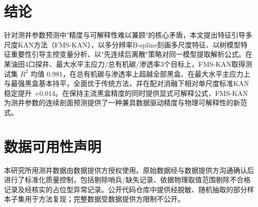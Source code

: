 \documentclass[final,3p,times,twocolumn]{elsarticle}
\begin{document}
\section{结论}

针对测井参数预测中"精度与可解释性难以兼顾"的核心矛盾，本文提出特征引导多尺度KAN方法（FMS-KAN），以多分辨率B-spline刻画多尺度特征、以树模型特征重要性引导主控变量分析、以"先连续后离散"策略对同一模型提取解析公式。在某油田4口探井、最大水平主应力/总有机碳/渗透率3个目标上，FMS-KAN取得测试集 $R^2$ 均值 0.981，在总有机碳与渗透率上超越全部黑盒、在最大水平主应力上与最强黑盒基本持平，全面优于传统方法，并在配对消融下相对单尺度标准KAN稳定提升 +0.014。在保持主流黑盒精度的同时提供显式可解释公式，FMS-KAN为测井参数的连续剖面预测提供了一种兼具数据驱动精度与物理可解释性的新范式。

\section*{数据可用性声明}
本研究所用测井数据由数据提供方授权使用。原始数据经与数据提供方沟通确认后进行了标准化质量控制，包括剔除哨兵/缺失记录、依据物理取值范围剔除不合格记录及经核实的占位型异常记录。公开代码仓库中提供经脱敏、随机抽取的部分样本子集用于方法复现；完整数据受数据提供方限制不公开。
\end{document}
